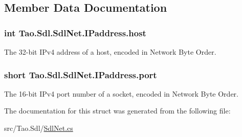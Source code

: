 \subsection{Member Data Documentation}
\hypertarget{struct_tao_1_1_sdl_1_1_sdl_net_1_1_i_paddress_aa491b12a09f8f4001630a535f8280a63}{
\subsubsection[{host}]{\setlength{\rightskip}{0pt plus 5cm}int {\bf Tao.Sdl.SdlNet.IPaddress.host}}}
\label{struct_tao_1_1_sdl_1_1_sdl_net_1_1_i_paddress_aa491b12a09f8f4001630a535f8280a63}


The 32-\/bit IPv4 address of a host, encoded in Network Byte Order. 

\hypertarget{struct_tao_1_1_sdl_1_1_sdl_net_1_1_i_paddress_ac07531607885b2bd9f0510a252d7387e}{
\subsubsection[{port}]{\setlength{\rightskip}{0pt plus 5cm}short {\bf Tao.Sdl.SdlNet.IPaddress.port}}}
\label{struct_tao_1_1_sdl_1_1_sdl_net_1_1_i_paddress_ac07531607885b2bd9f0510a252d7387e}


The 16-\/bit IPv4 port number of a socket, encoded in Network Byte Order. 



The documentation for this struct was generated from the following file:\begin{DoxyCompactItemize}
\item 
src/Tao.Sdl/\hyperlink{_sdl_net_8cs}{SdlNet.cs}\end{DoxyCompactItemize}
